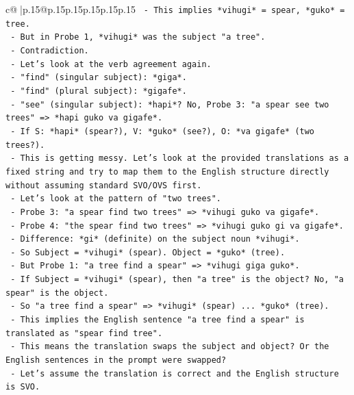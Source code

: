 \documentclass{article}
\begin{document}
{\begin{supertabular}{c@{$\;$}|p{.15\linewidth}@{}p{.15\linewidth}p{.15\linewidth}p{.15\linewidth}p{.15\linewidth}p{.15\linewidth}}
{{{\texttt{        {-} This implies *vihugi* = spear, *guko* = tree.} \\
\texttt{        {-} But in Probe 1, *vihugi* was the subject "a tree".} \\
\texttt{        {-} Contradiction.} \\
\texttt{    {-} Let's look at the verb agreement again.} \\
\texttt{      {-} "find" (singular subject): *giga*.} \\
\texttt{      {-} "find" (plural subject): *gigafe*.} \\
\texttt{      {-} "see" (singular subject): *hapi*? No, Probe 3: "a spear see two trees" => *hapi guko va gigafe*.} \\
\texttt{        {-} If S: *hapi* (spear?), V: *guko* (see?), O: *va gigafe* (two trees?).} \\
\texttt{        {-} This is getting messy. Let's look at the provided translations as a fixed string and try to map them to the English structure directly without assuming standard SVO/OVS first.} \\
\texttt{      {-} Let's look at the pattern of "two trees".} \\
\texttt{        {-} Probe 3: "a spear find two trees" => *vihugi guko va gigafe*.} \\
\texttt{        {-} Probe 4: "the spear find two trees" => *vihugi guko gi va gigafe*.} \\
\texttt{        {-} Difference: *gi* (definite) on the subject noun *vihugi*.} \\
\texttt{        {-} So Subject = *vihugi* (spear). Object = *guko* (tree).} \\
\texttt{        {-} But Probe 1: "a tree find a spear" => *vihugi giga guko*.} \\
\texttt{        {-} If Subject = *vihugi* (spear), then "a tree" is the object? No, "a spear" is the object.} \\
\texttt{        {-} So "a tree find a spear" => *vihugi* (spear) ... *guko* (tree).} \\
\texttt{        {-} This implies the English sentence "a tree find a spear" is translated as "spear find tree".} \\
\texttt{        {-} This means the translation swaps the subject and object? Or the English sentences in the prompt were swapped?} \\
\texttt{        {-} Let's assume the translation is correct and the English structure is SVO.} \\
}}}
\end{supertabular}}
\end{document}
